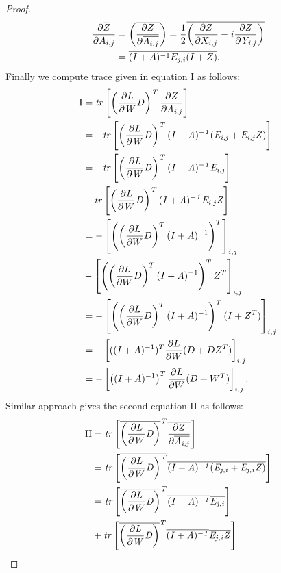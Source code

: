 \documentclass[letterpaper]{article} %
\begin{document}
\begin{proof}
\begin{align*}
\frac{\partial \overline{Z}}{\partial A_{i,j}} 
&= \left(\overline{\frac{\partial Z}{\partial \overline{A_{i,j}}}}\right)=\frac{1}{2}\overline{\left( \frac{\partial Z }{\partial X_{i,j}} -\it{i} \frac{\partial Z}{\partial Y_{i,j}}\right)}\\
&= \overline{(I+A)^{-1} E_{j,i}(I+Z)}.
\end{align*}
Finally we compute trace given in equation I as follows:
\begin{align*}
\text{I} &= \it{tr}\left[\left(\frac{\partial L}{\partial W} D\right)^T \frac{\partial Z}{\partial A_{i,j}}\right]\\
&= -\it{tr}\left[\left(\frac{\partial L}{\partial W} D\right)^T (I+A)^{-1}(E_{i,j}+E_{i,j}Z) \right]\\
&= -\it{tr}\left[\left(\frac{\partial L}{\partial W} D\right)^T (I+A)^{-1}E_{i,j}\right]\\
&-\it{tr}\left[\left(\frac{\partial L}{\partial W} D\right)^T (I+A)^{-1}E_{i,j}Z\right]\\
&= -\left[\left(\left(\frac{\partial L}{\partial W} D\right)^T (I+A)^{-1}\right)^T\right]_{i,j}\\
&-\left[\left(\left(\frac{\partial L}{\partial W} D\right)^T (I+A)^{-1}\right)^T Z^T\right]_{i,j}\\
&= -\left[\left(\left(\frac{\partial L}{\partial W} D\right)^T (I+A)^{-1}\right)^T(I+Z^T)\right]_{i,j}\\
&=-\left[ ((I+A)^{-1})^T \frac{\partial L}{\partial W} (D +DZ^T)\right]_{i,j}  \\
&= -\left[ \left((I+A)^{-1}\right)^T \frac{\partial L}{\partial W}(D+W^T)\right]_{i,j}.
\end{align*}
\noindent Similar approach gives the second equation II as follows:
\begin{align*}
\text{II} &= \it{tr}\left[\overline{\left(\frac{\partial L}{\partial W} D\right)}^T \overline{\frac{\partial Z}{\partial \overline{A_{i,j}}}}\right]\\
&= \it{tr}\left[\overline{\left(\frac{\partial L}{\partial W} D\right)^T} \overline{(I+A)^{-1}}\overline{(E_{j,i}+E_{j,i}Z)} \right]\\
&= \it{tr}\left[\overline{\left(\frac{\partial L}{\partial W} D\right)}^T \overline{(I+A)^{-1}} \overline{E_{j,i}}  \right] \\ 
&+ \it{tr}\left[\overline{\left(\frac{\partial L}{\partial W} D\right)}^T \overline{(I+A)^{-1}} \overline{E_{j,i}Z}  \right]\\

\end{align*}
\end{proof}
\end{document}
